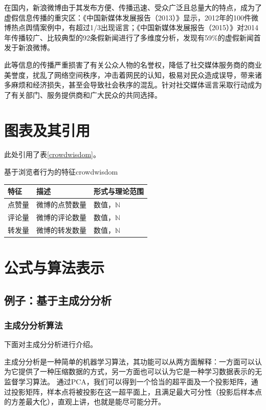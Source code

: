 \documentclass[a4paper,AutoFakeBold,oneside,12pt]{book}
\begin{document}
在国内，新浪微博由于其发布方便、传播迅速、受众广泛且总量大的特点，成为了虚假信息传播的重灾区：《中国新媒体发展报告（2013）》\cite{唐绪军2013中国新媒体发展报告}显示，2012年的100件微博热点舆情案例中，有超过1/3出现谣言；《中国新媒体发展报告（2015）》\cite{唐绪军2015中国新媒体发展报告}对2014年传播较广、比较典型的92条假新闻进行了多维度分析，发现有59\%的虚假新闻首发于新浪微博。

此等信息的传播严重损害了有关公众人物的名誉权，降低了社交媒体服务商的商业美誉度，扰乱了网络空间秩序，冲击着网民的认知，极易对民众造成误导，带来诸多麻烦和经济损失，甚至会导致社会秩序的混乱。针对社交媒体谣言采取行动成为了有关部门、服务提供商和广大民众的共同选择。\cite{周兴2017基于深度学习的谣言检测及模式挖掘}

\section{图表及其引用}
此处引用了表\ref{crowdwisdom}。

\begin{bupttable}{基于浏览者行为的特征}{crowdwisdom}
    \begin{tabular}{l|l|l}
		\hline \textbf{特征} & \textbf{描述} & \textbf{形式与理论范围}\\
		\hline 点赞量 & 微博的点赞数量 & 数值，$\mathbb{N}$ \\
		\hline 评论量 & 微博的评论数量 & 数值，$\mathbb{N}$ \\
		\hline 转发量 & 微博的转发数量 & 数值，$\mathbb{N}$ \\
		\hline
    \end{tabular}
\end{bupttable}


\section{公式与算法表示}

\subsection{例子：基于主成分分析}

\subsubsection{主成分分析算法}

下面对主成分分析进行介绍。

主成分分析是一种简单的机器学习算法，其功能可以从两方面解释：一方面可以认为它提供了一种压缩数据的方式，另一方面也可以认为它是一种学习数据表示的无监督学习算法。\cite{Goodfellow2016DeepLearning}
通过PCA，我们可以得到一个恰当的超平面及一个投影矩阵，通过投影矩阵，样本点将被投影在这一超平面上，且满足最大可分性（投影后样本点的方差最大化），直观上讲，也就是能尽可能分开。
\end{document}
